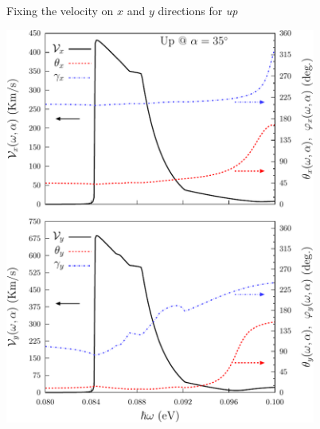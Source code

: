 \documentclass{beamer}
\begin{document}


\begin{frame}

\begin{columns}


\begin{center}

\vspace{-3mm}
{\small Fixing the velocity on $x$ and $y$ directions for \emph{up}}

\vspace{2mm}

\includegraphics[width=0.80\textwidth]{figs/fig7.pdf}

\end{center}  



\vspace{-2mm}


\vspace{-6mm}
\begin{center}


\end{center}
\end{columns}
\end{frame}
\end{document}
